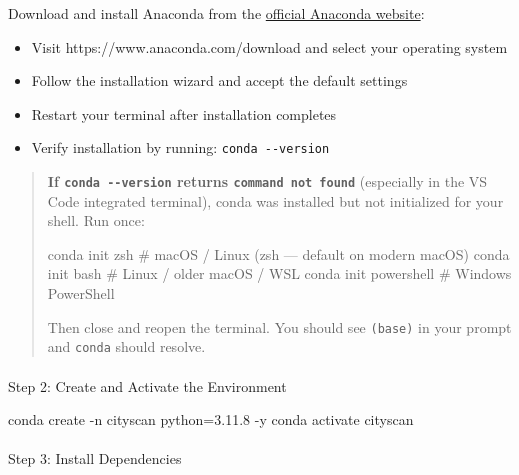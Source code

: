 \documentclass[
  letterpaper,
  DIV=11,
  numbers=noendperiod]{scrreprt}
\makeatletter
\let\oldparagraph\paragraph
\renewcommand{\paragraph}{
    \@ifstar
      \xxxParagraphStar
      \xxxParagraphNoStar
  }
\newcommand{\xxxParagraphStar}[1]{\oldparagraph*{#1}\mbox{}}
\newcommand{\xxxParagraphNoStar}[1]{\oldparagraph{#1}\mbox{}}
\newenvironment{Shaded}{\begin{snugshade}}{\end{snugshade}}
\newcommand{\AttributeTok}[1]{\textcolor[rgb]{0.40,0.45,0.13}{#1}}
\newcommand{\CommentTok}[1]{\textcolor[rgb]{0.37,0.37,0.37}{#1}}
\newcommand{\ExtensionTok}[1]{\textcolor[rgb]{0.00,0.23,0.31}{#1}}
\newcommand{\NormalTok}[1]{\textcolor[rgb]{0.00,0.23,0.31}{#1}}
\providecommand{\tightlist}{%
  \setlength{\itemsep}{0pt}\setlength{\parskip}{0pt}}
\makeatother
\begin{document}
Download and install Anaconda from the
\href{https://www.anaconda.com/download}{official Anaconda website}:

\begin{itemize}
\tightlist
\item
  Visit https://www.anaconda.com/download and select your operating
  system
\item
  Follow the installation wizard and accept the default settings
\item
  Restart your terminal after installation completes
\item
  Verify installation by running: \texttt{conda\ -\/-version}
\end{itemize}

\begin{quote}
\textbf{If \texttt{conda\ -\/-version} returns
\texttt{command\ not\ found}} (especially in the VS Code integrated
terminal), conda was installed but not initialized for your shell. Run
once:

\begin{Shaded}
\begin{Highlighting}[]
\ExtensionTok{conda}\NormalTok{ init zsh        }\CommentTok{\# macOS / Linux (zsh — default on modern macOS)}
\ExtensionTok{conda}\NormalTok{ init bash       }\CommentTok{\# Linux / older macOS / WSL}
\ExtensionTok{conda}\NormalTok{ init powershell }\CommentTok{\# Windows PowerShell}
\end{Highlighting}
\end{Shaded}

Then close and reopen the terminal. You should see \texttt{(base)} in
your prompt and \texttt{conda} should resolve.
\end{quote}

\paragraph{Step 2: Create and Activate the
Environment}\label{step-2-create-and-activate-the-environment}

\begin{Shaded}
\begin{Highlighting}[]
\ExtensionTok{conda}\NormalTok{ create }\AttributeTok{{-}n}\NormalTok{ cityscan python=3.11.8 }\AttributeTok{{-}y}
\ExtensionTok{conda}\NormalTok{ activate cityscan}
\end{Highlighting}
\end{Shaded}

\paragraph{Step 3: Install
Dependencies}\label{step-3-install-dependencies}
\end{document}
